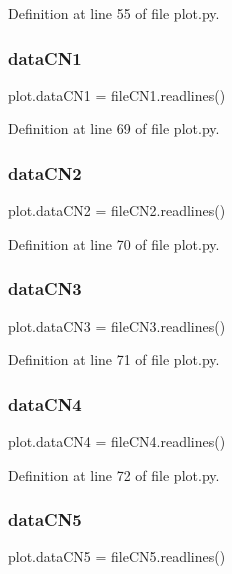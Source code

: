 Definition at line 55 of file plot.\+py.

\mbox{\label{namespaceplot_aaaa7102135379be356a0bf02876af4ec}} 
\subsubsection{data\+C\+N1}
{\footnotesize\ttfamily plot.\+data\+C\+N1 = file\+C\+N1.\+readlines()}



Definition at line 69 of file plot.\+py.

\mbox{\label{namespaceplot_a589c3ee9737c1173a283c24b2c85f694}} 
\subsubsection{data\+C\+N2}
{\footnotesize\ttfamily plot.\+data\+C\+N2 = file\+C\+N2.\+readlines()}



Definition at line 70 of file plot.\+py.

\mbox{\label{namespaceplot_ac08ad4d596d0ac208a9e0d753c83429f}} 
\subsubsection{data\+C\+N3}
{\footnotesize\ttfamily plot.\+data\+C\+N3 = file\+C\+N3.\+readlines()}



Definition at line 71 of file plot.\+py.

\mbox{\label{namespaceplot_acb8310848aa502a58c72eae64bc491d7}} 
\subsubsection{data\+C\+N4}
{\footnotesize\ttfamily plot.\+data\+C\+N4 = file\+C\+N4.\+readlines()}



Definition at line 72 of file plot.\+py.

\mbox{\label{namespaceplot_a70d2bad387398048b725a580c5dd069d}} 
\subsubsection{data\+C\+N5}
{\footnotesize\ttfamily plot.\+data\+C\+N5 = file\+C\+N5.\+readlines()}



